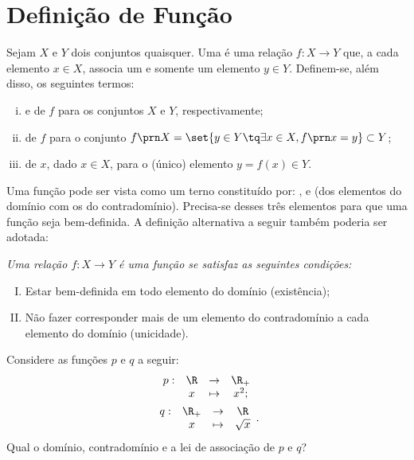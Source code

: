 \section{Definição de Função}

\begin{definition}
Sejam $X$ e $Y$ dois conjuntos quaisquer.
Uma  é uma relação $f: X \to Y$ que, a cada elemento $x \in X$, associa um e somente um elemento $y \in Y$.
Definem-se, além disso, os seguintes termos:
%
\begin{enumerate}[(i)]
  \item {} e  de $f$ para os conjuntos $X$ e $Y$, respectivamente;
  \item {} de $f$ para o conjunto $f\prn X = \set{y \in Y \tq \exists x \in X , f \prn x =
  y} \subset Y$;
  \item {} de $x$, dado $x \in X$, para o (único) elemento $y = f(x) \in Y$.
\end{enumerate}
\end{definition}

\begin{remark}
\label{rem:def-alternativa-funcao}
Uma função pode ser vista como um terno constituído por: ,  e  (dos elementos do
domínio com os do contradomínio). 
Precisa-se desses três elementos para que uma função seja bem-definida. 
A definição alternativa a seguir também poderia ser adotada:

{\it Uma relação $f: X \to Y$ é uma \emph {função} se satisfaz as seguintes condições:
%
\begin{enumerate}[(I)]
  \item Estar bem-definida em todo elemento do domínio (existência);
  \item Não fazer corresponder mais de um elemento do contradomínio
  a cada elemento do domínio (unicidade).
\end{enumerate}}
\end{remark}

\begin{example}
\label{example:func-sq-sqrt}
Considere as funções $p$ e $q$ a seguir:
%
\begin{gather*}
\begin{array}{cccc}
p : & \R & \to     & \R_+ \\
     &  x & \mapsto & x^2;
\end{array}\\
\begin{array}{cccc}
q : & \R_+ & \to     & \R \\
     &  x & \mapsto & \sqrt x
\end{array}.
\end{gather*}
%
Qual o domínio, contradomínio e a lei de associação de $p$ e $q$?
\end{example}

